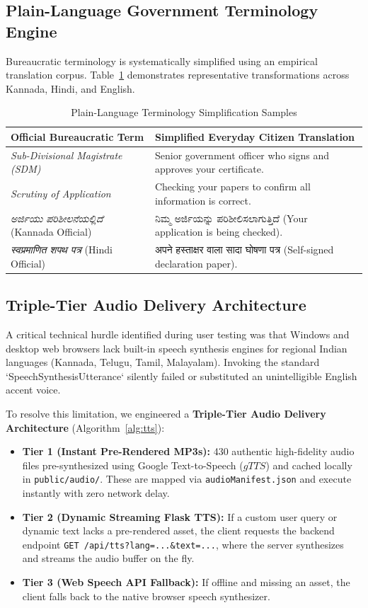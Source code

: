 \documentclass[conference]{IEEEtran}
\begin{document}
\subsection{Plain-Language Government Terminology Engine}
Bureaucratic terminology is systematically simplified using an empirical translation corpus. Table~\ref{tab:terminology} demonstrates representative transformations across Kannada, Hindi, and English.

\begin{table}[htbp]
\caption{Plain-Language Terminology Simplification Samples}
\label{tab:terminology}
\centering
\begin{tabularx}{\columnwidth}{p{2.3cm}X}
\toprule
\textbf{Official Bureaucratic Term} & \textbf{Simplified Everyday Citizen Translation} \\
\midrule
\textit{Sub-Divisional Magistrate (SDM)} & Senior government officer who signs and approves your certificate. \\
\addlinespace
\textit{Scrutiny of Application} & Checking your papers to confirm all information is correct. \\
\addlinespace
\textit{ಅರ್ಜಿಯು ಪರಿಶೀಲನೆಯಲ್ಲಿದೆ} (Kannada Official) & ನಿಮ್ಮ ಅರ್ಜಿಯನ್ನು ಪರಿಶೀಲಿಸಲಾಗುತ್ತಿದೆ (Your application is being checked). \\
\addlinespace
\textit{स्वप्रमाणित शपथ पत्र} (Hindi Official) & अपने हस्ताक्षर वाला सादा घोषणा पत्र (Self-signed declaration paper). \\
\bottomrule
\end{tabularx}
\end{table}

\subsection{Triple-Tier Audio Delivery Architecture}
A critical technical hurdle identified during user testing was that Windows and desktop web browsers lack built-in speech synthesis engines for regional Indian languages (Kannada, Telugu, Tamil, Malayalam). Invoking the standard `SpeechSynthesisUtterance` silently failed or substituted an unintelligible English accent voice.

To resolve this limitation, we engineered a \textbf{Triple-Tier Audio Delivery Architecture} (Algorithm~\ref{alg:tts}):
\begin{itemize}
    \item \textbf{Tier 1 (Instant Pre-Rendered MP3s):} 430 authentic high-fidelity audio files pre-synthesized using Google Text-to-Speech ($gTTS$) and cached locally in \texttt{public/audio/}. These are mapped via \texttt{audioManifest.json} and execute instantly with zero network delay.
    \item \textbf{Tier 2 (Dynamic Streaming Flask TTS):} If a custom user query or dynamic text lacks a pre-rendered asset, the client requests the backend endpoint \texttt{GET /api/tts?lang=...&text=...}, where the server synthesizes and streams the audio buffer on the fly.
    \item \textbf{Tier 3 (Web Speech API Fallback):} If offline and missing an asset, the client falls back to the native browser speech synthesizer.
\end{itemize}
\end{document}
